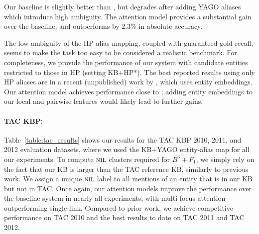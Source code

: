 Our baseline is slightly better than , but degrades
after adding YAGO aliases which introduce high ambiguity. %
The attention model provides a substantial gain over
the baseline, and outperforms  by
2.3\% in absolute accuracy.

The low ambiguity of the HP alias mapping, coupled with
guaranteed gold recall, seems to make the task too easy to be
considered a realistic benchmark. For completeness, we provide
the performance of our system with candidate entities restricted to those in HP
(setting KB+HP*). 
The best reported results using only HP aliases 
are in a recent (unpublished) work by ,
which uses entity embeddings. Our attention model achieves
performance close to ; adding entity embeddings
to our local and pairwise features would likely lead to further gains.


\paragraph*{TAC KBP:}
Table~\ref{table:tac_results} shows our results for the TAC KBP 2010, 2011, and 2012
evaluation datasets, where we used the KB+YAGO entity-alias map for all our experiments. 
To compute $\mbox{\textsc{nil}}$ clusters required for $B^3+F_1$, we simply rely on the fact that our KB is larger than the TAC
reference KB, similarly to previous work. We assign a unique $\mbox{\textsc{nil}}$ label to
all mentions of an entity that is in our KB but not in TAC. 
Once again, our attention models improve the performance over the baseline
system in nearly all experiments, with multi-focus attention outperforming single-link. Compared to
prior work, we achieve competitive performance on TAC 2010 and the best
results to date on TAC 2011 and TAC 2012.

